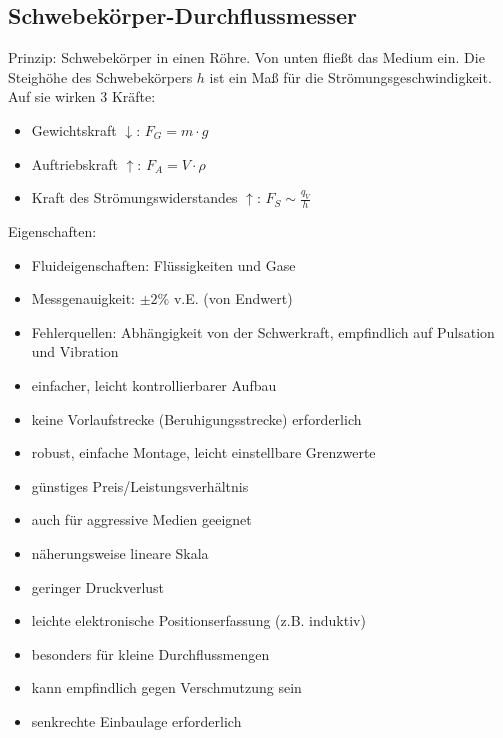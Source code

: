 \subsection{Schwebekörper-Durchflussmesser}
Prinzip: Schwebekörper in einen Röhre. Von unten fließt das Medium ein. Die Steighöhe des Schwebekörpers $h$ ist ein Maß für die Strömungsgeschwindigkeit. Auf sie wirken 3 Kräfte:
\begin{itemize}
\item Gewichtskraft $\downarrow$: $F_G=m\cdot g$
\item Auftriebskraft $\uparrow$: $F_A=V\cdot \rho$
\item Kraft des Strömungswiderstandes $\uparrow$: $F_S\sim \frac{q_V}{h}$
\end{itemize}
Eigenschaften:
\begin{itemize}
\item Fluideigenschaften: Flüssigkeiten und Gase
\item Messgenauigkeit: $\pm 2\%$ v.E. (von Endwert)
\item Fehlerquellen: Abhängigkeit von der Schwerkraft, empfindlich auf Pulsation und Vibration
\end{itemize}
\begin{itemize}[label=$+$]
\item einfacher, leicht kontrollierbarer Aufbau
\item keine Vorlaufstrecke (Beruhigungsstrecke) erforderlich
\item robust, einfache Montage, leicht einstellbare Grenzwerte
\item günstiges Preis/Leistungsverhältnis
\item auch für aggressive Medien geeignet
\item näherungsweise lineare Skala
\item geringer Druckverlust
\item leichte elektronische Positionserfassung (z.B. induktiv)
\item besonders für kleine Durchflussmengen
\end{itemize}
\begin{itemize}[label=$-$]
\item kann empfindlich gegen Verschmutzung sein
\item senkrechte Einbaulage erforderlich
\end{itemize}


